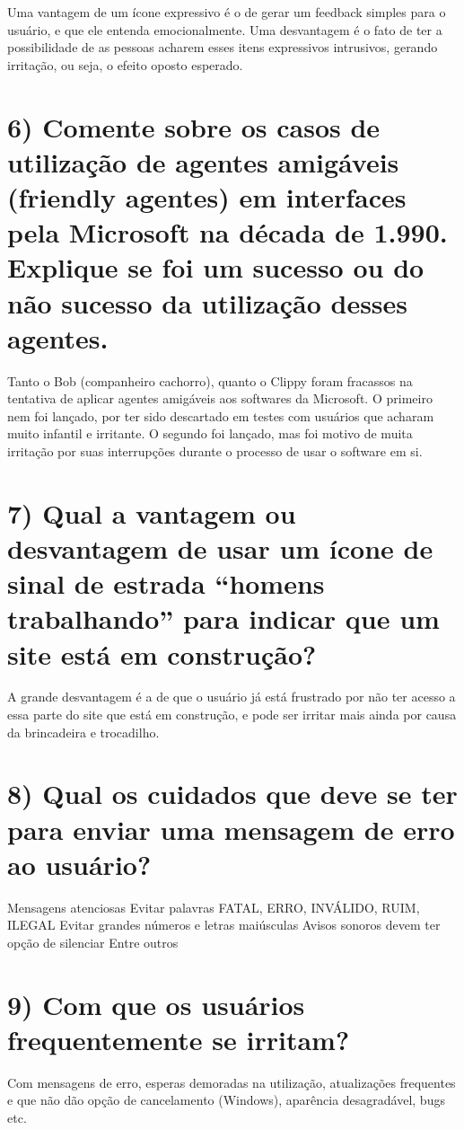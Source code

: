 Uma vantagem de um ícone expressivo é o de gerar um feedback simples para o 
usuário, e que ele entenda emocionalmente. Uma desvantagem é o fato de ter a 
possibilidade de as pessoas acharem esses itens expressivos intrusivos, 
gerando irritação, ou seja, o efeito oposto esperado.

\section{6) Comente sobre os casos de utilização de agentes amigáveis 
(friendly agentes) em interfaces pela Microsoft na década de 1.990. 
Explique se foi um sucesso ou do não sucesso da utilização desses agentes.}
Tanto o Bob (companheiro cachorro), quanto o Clippy foram fracassos na 
tentativa de aplicar agentes amigáveis aos softwares da Microsoft. O primeiro 
nem foi lançado, por ter sido descartado em testes com usuários que acharam 
muito infantil e irritante. O segundo foi lançado, mas foi motivo de muita 
irritação por suas interrupções durante o processo de usar o software em si.

\section{7) Qual a vantagem ou desvantagem de usar um ícone de sinal de estrada
“homens trabalhando” para indicar que um site está em construção?}

A grande desvantagem é a de que o usuário já está frustrado por não ter acesso 
a essa parte do site que está em construção, e pode ser irritar mais ainda por 
causa da brincadeira e trocadilho.

\section{8) Qual os cuidados que deve se ter para enviar uma mensagem de 
erro ao usuário?}

Mensagens atenciosas
Evitar palavras FATAL, ERRO, INVÁLIDO, RUIM, ILEGAL
Evitar grandes números e letras maiúsculas
Avisos sonoros devem ter opção de silenciar
Entre outros

\section{9) Com que os usuários frequentemente se irritam?}

Com mensagens de erro, esperas demoradas na utilização, atualizações 
frequentes e que não dão opção de cancelamento (Windows), 
aparência desagradável, bugs etc.

